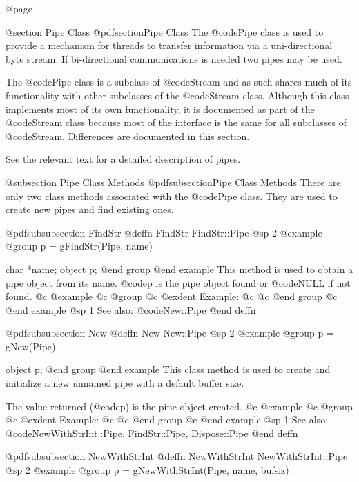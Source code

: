 @page

@section Pipe Class
@pdfsection{Pipe Class}
The @code{Pipe} class is used to provide a mechanism for threads
to transfer information via a uni-directional byte stream.  If
bi-directional communications is needed two pipes may be used.

The @code{Pipe} class is a subclass of @code{Stream} and as such shares
much of its functionality with other subclasses of the @code{Stream}
class.  Although this class implements most of its own functionality, it
is documented as part of the @code{Stream} class because most of the
interface is the same for all subclasses of @code{Stream}.  Differences
are documented in this section.


See the relevant text for a detailed description of pipes.





@subsection Pipe Class Methods
@pdfsubsection{Pipe Class Methods}
There are only two class methods associated with the @code{Pipe} class.
They are used to create new pipes and find existing ones.








@pdfsubsubsection {FindStr}
@deffn {FindStr} FindStr::Pipe
@sp 2
@example
@group
p = gFindStr(Pipe, name)

char    *name;
object  p;
@end group
@end example
This method is used to obtain a pipe object from its name.  @code{p}
is the pipe object found or @code{NULL} if not found.
@c @example
@c @group
@c @exdent Example:
@c 
@c @end group
@c @end example
@sp 1
See also:  @code{New::Pipe}
@end deffn





@pdfsubsubsection {New}
@deffn {New} New::Pipe
@sp 2
@example
@group
p = gNew(Pipe)

object  p;
@end group
@end example
This class method is used to create and initialize a new unnamed pipe
with a default buffer size.

The value returned (@code{p}) is the pipe object created.
@c @example
@c @group
@c @exdent Example:
@c 
@c @end group
@c @end example
@sp 1
See also:  @code{NewWithStrInt::Pipe, FindStr::Pipe, Dispose::Pipe}
@end deffn










@pdfsubsubsection {NewWithStrInt}
@deffn {NewWithStrInt} NewWithStrInt::Pipe
@sp 2
@example
@group
p = gNewWithStrInt(Pipe, name, bufsiz)

